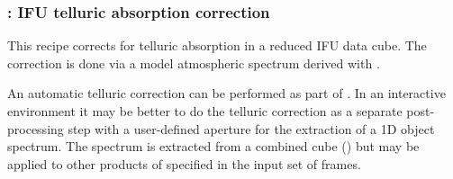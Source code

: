 \clearpage
\subsubsection{: IFU telluric absorption correction}
\label{sssec:ifu_tellcorr}
\label{rec:metis_ifu_tellcorr}

This recipe corrects for telluric absorption in a reduced IFU data
cube. The correction is done via a model atmospheric spectrum derived
with .

An automatic telluric correction can be performed as part of
\hyperref[rec:metis_ifu_sci_process]{}. In an interactive environment it may be
better to do the telluric correction as a separate post-processing
step with a user-defined aperture for the extraction of a 1D object
spectrum. The spectrum is extracted from a combined cube
(\hyperref[dataitem:ifu_sci_combined]{}) but may be applied to other products of
\hyperref[rec:metis_ifu_sci_process]{} specified in the input set of frames.

